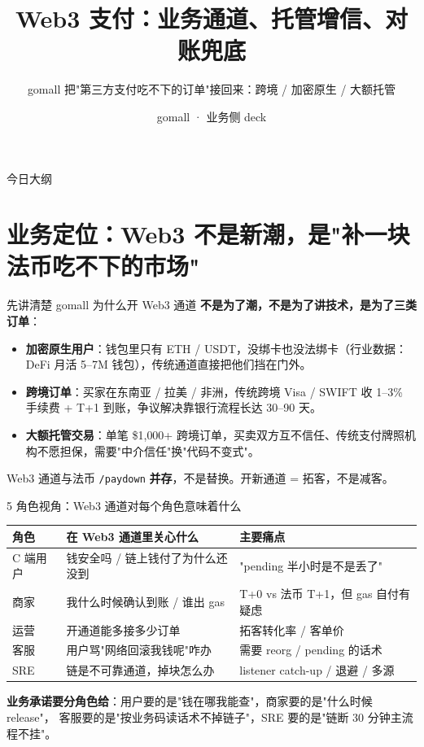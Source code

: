 \documentclass[aspectratio=169,11pt]{beamer}
\title{Web3 支付：业务通道、托管增信、对账兜底}
\subtitle{gomall 把"第三方支付吃不下的订单"接回来：跨境 / 加密原生 / 大额托管}
\author{gomall · 业务侧 deck}
\date{}
\begin{document}
\maketitle

\begin{frame}[shrink]{今日大纲}
\tableofcontents
\end{frame}

\section{业务定位：Web3 不是新潮，是"补一块法币吃不下的市场"}

\begin{frame}[shrink]{先讲清楚 gomall 为什么开 Web3 通道}
\textbf{不是为了潮，不是为了讲技术，是为了三类订单}：
\begin{itemize}
  \item \textbf{加密原生用户}：钱包里只有 ETH / USDT，没绑卡也没法绑卡（行业数据：DeFi 月活 5--7M 钱包），传统通道直接把他们挡在门外。
  \item \textbf{跨境订单}：买家在东南亚 / 拉美 / 非洲，传统跨境 Visa / SWIFT 收 1--3\% 手续费 + T+1 到账，争议解决靠银行流程长达 30--90 天。
  \item \textbf{大额托管交易}：单笔 \$1{,}000+ 跨境订单，买卖双方互不信任、传统支付牌照机构不愿担保，需要"中介信任"换"代码不变式"。
\end{itemize}
\vspace{1mm}
\small Web3 通道与法币 \texttt{/paydown} \textbf{并存}，不是替换。开新通道 = 拓客，不是减客。
\end{frame}

\begin{frame}[shrink]{5 角色视角：Web3 通道对每个角色意味着什么}
\begin{tabular}{@{}lll@{}}
\toprule
角色 & 在 Web3 通道里关心什么 & 主要痛点 \\
\midrule
C 端用户 & 钱安全吗 / 链上钱付了为什么还没到 & "pending 半小时是不是丢了" \\
商家   & 我什么时候确认到账 / 谁出 gas    & T+0 vs 法币 T+1，但 gas 自付有疑虑 \\
运营   & 开通道能多接多少订单             & 拓客转化率 / 客单价 \\
客服   & 用户骂"网络回滚我钱呢"咋办      & 需要 reorg / pending 的话术 \\
SRE    & 链是不可靠通道，掉块怎么办       & listener catch-up / 退避 / 多源 \\
\bottomrule
\end{tabular}
\vspace{2mm}
\small \textbf{业务承诺要分角色给}：用户要的是"钱在哪我能查"，商家要的是"什么时候 release"，
客服要的是"按业务码读话术不掉链子"，SRE 要的是"链断 30 分钟主流程不挂"。
\end{frame}
\end{document}
